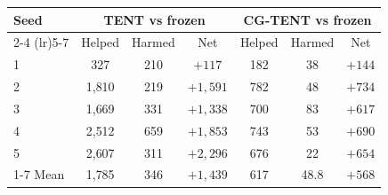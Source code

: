 \footnotesize
\setlength{\tabcolsep}{2.5pt}
\begin{tabular}{lcccccc}
\toprule
Seed & \multicolumn{3}{c}{TENT vs frozen} & \multicolumn{3}{c}{CG-TENT vs frozen} \\
\cmidrule(lr){2-4} \cmidrule(lr){5-7}
 & Helped & Harmed & Net & Helped & Harmed & Net \\
\midrule
1 & 327 & 210 & $+117$ & 182 & 38 & $+144$ \\
2 & 1{,}810 & 219 & $+1{,}591$ & 782 & 48 & $+734$ \\
3 & 1{,}669 & 331 & $+1{,}338$ & 700 & 83 & $+617$ \\
4 & 2{,}512 & 659 & $+1{,}853$ & 743 & 53 & $+690$ \\
5 & 2{,}607 & 311 & $+2{,}296$ & 676 & 22 & $+654$ \\
\cmidrule(lr){1-7}
Mean & 1{,}785 & 346 & $+1{,}439$ & 617 & 48.8 & $+568$ \\
\bottomrule
\end{tabular}
